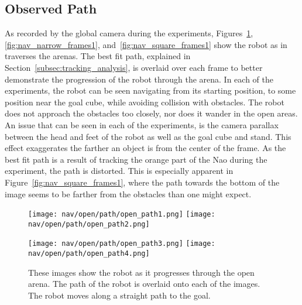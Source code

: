 \subsection{Observed Path}

As recorded by the global camera during the experiments, Figures~\ref{fig:nav_open_frames1},
\ref{fig:nav_narrow_frames1}, and~\ref{fig:nav_square_frames1} show the robot
as in traverses the arenas. The best fit path, explained in Section~\ref{subsec:tracking_analysis},
is overlaid over each frame to better demonstrate the progression of the robot 
through the arena. In each of the experiments, the robot can be seen navigating
from its starting position, to some position near the goal cube, while avoiding
collision with obstacles. The robot does not approach the obstacles too closely,
nor does it wander in the open areas. An issue that can be seen in each of the
experiments, is the camera parallax between the head and feet of the robot as well
as the goal cube and stand. This effect exaggerates the farther an object is from
the center of the frame. As the best fit path is a result of tracking the orange part
of the Nao during the experiment, the path is distorted. This is especially
apparent in Figure~\ref{fig:nav_square_frames1}, where the path towards the bottom
of the image seems to be farther from the obstacles than one might expect.

\begin{figure}
  \centerline{
    \texttt{[image: nav/open/path/open\_path1.png]}
    \texttt{[image: nav/open/path/open\_path2.png]}
  }
  \vspace*{0.05in}
  \centerline{
    \texttt{[image: nav/open/path/open\_path3.png]}
    \texttt{[image: nav/open/path/open\_path4.png]}
  }
  \caption{These images show the robot as it progresses through the open arena. 
           The path of the robot is overlaid onto each of the images.
           The robot moves along a straight path to the goal.}
  \label{fig:nav_open_frames1}
  \vspace*{-0.07in}
\end{figure}

